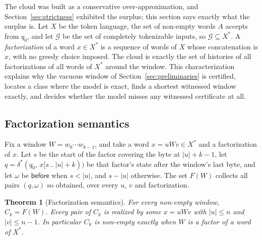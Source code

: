 \documentclass[11pt,a4paper]{article}
\theoremstyle{definition}
\theoremstyle{plain}
\newtheorem{theorem}{Theorem}
\newcommand{\before}{\mathsf{before}}
\begin{document}
The cloud was built as a conservative over-approximation, and Section~\ref{sec:strictness} exhibited the surplus; this
section says exactly what the surplus is. Let $X$ be the token language, the set of non-empty words $A$ accepts from
$q_0$, and let $\mathcal{G}$ be the set of completely tokenizable inputs, so $\mathcal{G} \subseteq X^*$. A
\emph{factorization} of a word $x \in X^*$ is a sequence of words of $X$ whose concatenation is $x$, with no greedy
choice imposed. The cloud is exactly the set of histories of all factorizations of all words of $X^*$ around the window.
This characterization explains why the vacuous window of Section~\ref{sec:preliminaries} is certified, locates a class
where the model is exact, finds a shortest witnessed window exactly, and decides whether the model misses any witnessed
certificate at all.

\subsection{Factorization semantics}
\label{sec:semantics}

Fix a window $W = w_0 \cdots w_{k-1}$, and take a word $x = u W v \in X^*$ and a factorization of $x$. Let $s$ be the
start of the factor covering the byte at $|u| + k - 1$, let $q = \delta^*(q_0,\, x[s \,..\, |u| + k))$ be that factor's
state after the window's last byte, and let $\omega$ be $\before$ when $s < |u|$, and $s - |u|$ otherwise. The set
$F(W)$ collects all pairs $(q, \omega)$ so obtained, over every $u$, $v$ and factorization.

\begin{theorem}[Factorization semantics]
\label{thm:factorization}
For every non-empty window, $C_k = F(W)$. Every pair of $C_k$ is realized by some $x = u W v$ with $|u| \leq n$ and
$|v| \leq n - 1$. In particular $C_k$ is non-empty exactly when $W$ is a factor of a word of $X^*$.
\end{theorem}
\end{document}
